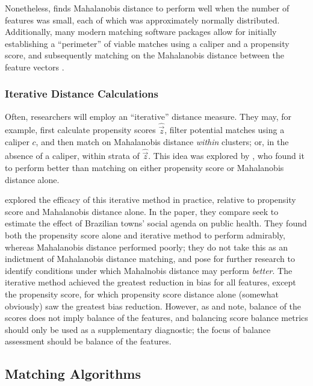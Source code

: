 \documentclass[11pt]{extarticle}
\begin{document}
Nonetheless, \textcite{leacy_joint_2014} finds Mahalanobis distance to perform well when the number of features was small, each of which was approximately normally distributed. Additionally, many modern matching software packages allow for initially establishing a ``perimeter'' of viable matches using a caliper and a propensity score, and subsequently matching on the Mahalanobis distance between the feature vectors \parencite{ho_matchit_2011}.

\subsubsection{Iterative Distance Calculations}

Often, researchers will employ an ``iterative'' distance measure. They may, for example, first calculate propensity scores $\widehat{\vec{z}}$, filter potential matches using a caliper $c$, and then match on Mahalanobis distance \emph{within} clusters; or, in the absence of a caliper, within strata of $\widehat{\vec{z}}$. This idea was explored by \textcite{rosenbaum_constructing_1985}, who found it to perform better than matching on either propensity score or Mahalanobis distance alone. 

\textcite{baltar_mahalanobis_2014} explored the efficacy of this iterative method in practice, relative to propensity score and Mahalanobis distance alone. In the paper, they compare seek to estimate the effect of Brazilian towns' social agenda on public health. They found both the propensity score alone and iterative method to perform admirably, whereas Mahalanobis distance performed poorly; they do not take this as an indictment of Mahalanobis distance matching, and pose for further research to identify conditions under which Mahalnobis distance may perform \emph{better}. The iterative method achieved the greatest reduction in bias for all features, except the propensity score, for which propensity score distance alone (somewhat obviously) saw the greatest bias reduction. However, as \textcite{austin_optimal_2011} and \textcite{greifer_assessing_2022} note, balance of the scores does not imply balance of the features, and balancing score balance metrics should only be used as a supplementary diagnostic; the focus of balance assessment should be balance of the features.

\subsection{Matching Algorithms}
\end{document}
